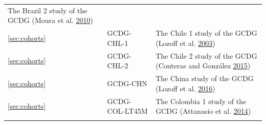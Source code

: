 \documentclass[
]{book}
\begin{document}
\begin{longtable}[]{@{}lll@{}}
\begin{minipage}[t]{0.61\columnwidth}
The Brazil 2 study of the GCDG (Moura et al. \protect\hyperlink{ref-Moura2010}{2010})\strut
\end{minipage}\tabularnewline
\begin{minipage}[t]{0.12\columnwidth}\raggedright
\ref{sec:cohorts}\strut
\end{minipage} & \begin{minipage}[t]{0.19\columnwidth}\raggedright
GCDG-CHL-1\strut
\end{minipage} & \begin{minipage}[t]{0.61\columnwidth}\raggedright
The Chile 1 study of the GCDG (Lozoff et al. \protect\hyperlink{ref-Lozoff2003}{2003})\strut
\end{minipage}\tabularnewline
\begin{minipage}[t]{0.12\columnwidth}\raggedright
\ref{sec:cohorts}\strut
\end{minipage} & \begin{minipage}[t]{0.19\columnwidth}\raggedright
GCDG-CHL-2\strut
\end{minipage} & \begin{minipage}[t]{0.61\columnwidth}\raggedright
The Chile 2 study of the GCDG (Conteras and González \protect\hyperlink{ref-conteras2015}{2015})\strut
\end{minipage}\tabularnewline
\begin{minipage}[t]{0.12\columnwidth}\raggedright
\ref{sec:cohorts}\strut
\end{minipage} & \begin{minipage}[t]{0.19\columnwidth}\raggedright
GCDG-CHN\strut
\end{minipage} & \begin{minipage}[t]{0.61\columnwidth}\raggedright
The China study of the GCDG (Lozoff et al. \protect\hyperlink{ref-Lozoff2016}{2016})\strut
\end{minipage}\tabularnewline
\begin{minipage}[t]{0.12\columnwidth}\raggedright
\ref{sec:cohorts}\strut
\end{minipage} & \begin{minipage}[t]{0.19\columnwidth}\raggedright
GCDG-COL-LT45M\strut
\end{minipage} & \begin{minipage}[t]{0.61\columnwidth}\raggedright
The Colombia 1 study of the GCDG (Attanasio et al. \protect\hyperlink{ref-Attanasio2014}{2014})\strut
\end{minipage}\tabularnewline
\begin{minipage}[t]{0.12\columnwidth}\raggedright

\end{minipage}
\end{longtable}
\end{document}
